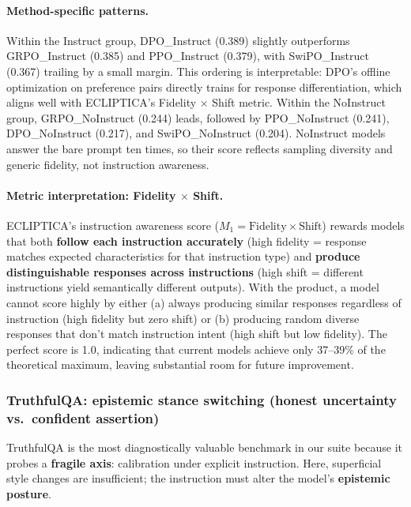 \paragraph{Method-specific patterns.}
Within the Instruct group, \textsc{DPO}\_Instruct (0.389) slightly outperforms \textsc{GRPO}\_Instruct (0.385) and \textsc{PPO}\_Instruct (0.379), with SwiPO\_Instruct (0.367) trailing by a small margin.
This ordering is interpretable: DPO's offline optimization on preference pairs directly trains for response differentiation, which aligns well with ECLIPTICA's Fidelity $\times$ Shift metric.
Within the NoInstruct group, \textsc{GRPO}\_NoInstruct (0.244) leads, followed by \textsc{PPO}\_NoInstruct (0.241), \textsc{DPO}\_NoInstruct (0.217), and SwiPO\_NoInstruct (0.204).
NoInstruct models answer the bare prompt ten times, so their score reflects sampling diversity and generic fidelity, not instruction awareness.

\paragraph{Metric interpretation: Fidelity $\times$ Shift.}
ECLIPTICA's instruction awareness score ($M_1 = \text{Fidelity} \times \text{Shift}$) rewards models that both \textbf{follow each instruction accurately} (high fidelity = response matches expected characteristics for that instruction type) and \textbf{produce distinguishable responses across instructions} (high shift = different instructions yield semantically different outputs).
With the product, a model cannot score highly by either (a) always producing similar responses regardless of instruction (high fidelity but zero shift) or (b) producing random diverse responses that don't match instruction intent (high shift but low fidelity).
The perfect score is 1.0, indicating that current models achieve only 37--39\% of the theoretical maximum, leaving substantial room for future improvement.

\vspace{-0.5em}
\subsubsection*{\textbf{TruthfulQA: epistemic stance switching (honest uncertainty vs.\ confident assertion)}}
TruthfulQA is the most diagnostically valuable benchmark in our suite because it probes a \textbf{fragile axis}:
calibration under explicit instruction.
Here, superficial style changes are insufficient; the instruction must alter the model's \textbf{epistemic posture}.

